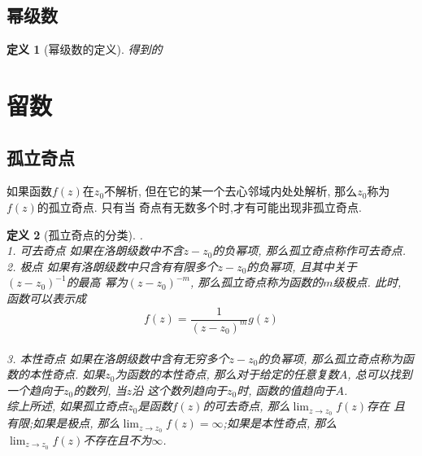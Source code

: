\documentclass[12pt, a4paper, oneside]{ctexart}
\theoremstyle{plain}
\newtheorem{definition}{定义}[section]
\theoremstyle{definition}
\theoremstyle{definition}
\begin{document}
\subsection{幂级数}
\begin{definition}[幂级数的定义]
    得到的
\end{definition}

\section{留数}
\subsection{孤立奇点}
如果函数$f(z)$在$z_0$不解析, 但在它的某一个去心邻域内处处解析, 那么$z_0$称为$f(z)$的孤立奇点. 只有当
奇点有无数多个时,才有可能出现非孤立奇点.
\begin{definition}[孤立奇点的分类]
    .\\1. 可去奇点 \space 如果在洛朗级数中不含$z-z_0$的负幂项, 那么孤立奇点称作可去奇点. \\
    2. 极点 \space 如果有洛朗级数中只含有有限多个$z-z_0$的负幂项, 且其中关于$(z-z_0)^{-1}$的最高
    幂为$(z-z_0)^{-m}$, 那么孤立奇点称为函数的$m$级极点. 此时, 函数可以表示成
    \[
    f(z)=\frac{1}{(z-z_0)^m}g(z)
    \] \\
    3. 本性奇点 \space 如果在洛朗级数中含有无穷多个$z-z_0$的负幂项, 那么孤立奇点称为函数的本性奇点. 
    如果$z_0$为函数的本性奇点, 那么对于给定的任意复数$A$, 总可以找到一个趋向于$z_0$的数列, 当$z$沿
    这个数列趋向于$z_0$时, 函数的值趋向于$A$.\\
    综上所述, 如果孤立奇点$z_0$是函数$f(z)$的可去奇点, 那么$\displaystyle\lim_{z\to z_0}f(z)$存在
    且有限;如果是极点, 那么$\displaystyle\lim_{z\to z_0}f(z)=\infty $;如果是本性奇点, 那么
    $\displaystyle\lim_{z\to z_0}f(z)$不存在且不为$\infty$.
\end{definition}
\end{document}
